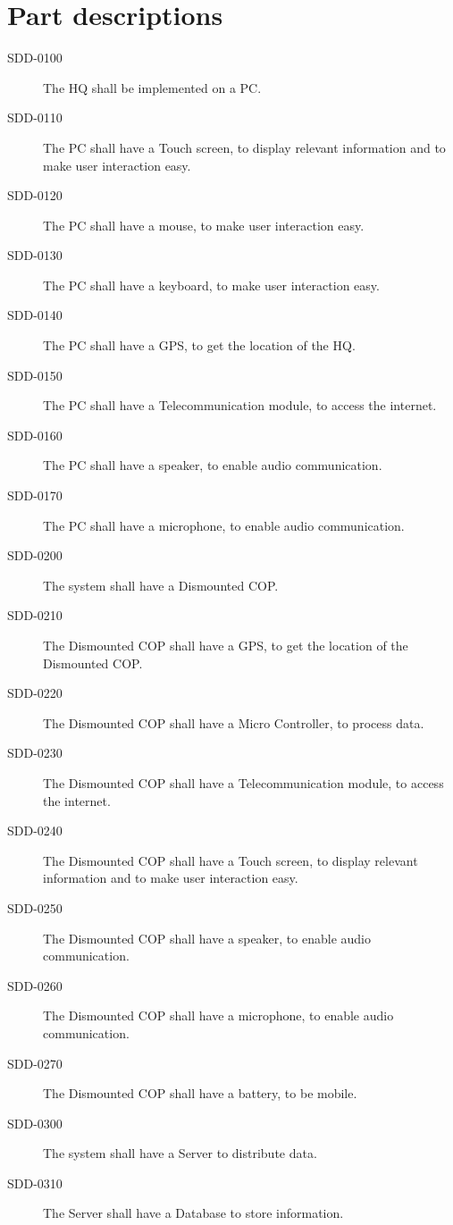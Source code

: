 \section{Part descriptions}
\begin{description}
\item[SDD-0100] The HQ shall be implemented on a PC.
\item[SDD-0110] The PC shall have a Touch screen, to display relevant information and to make user interaction easy.
\item[SDD-0120] The PC shall have a mouse, to make user interaction easy.
\item[SDD-0130] The PC shall have a keyboard, to make user interaction easy.
\item[SDD-0140] The PC shall have a GPS, to get the location of the HQ.
\item[SDD-0150] The PC shall have a Telecommunication module, to access the internet.
\item[SDD-0160] The PC shall have a speaker, to enable audio communication.
\item[SDD-0170] The PC shall have a microphone, to enable audio communication.
\item[SDD-0200] The system shall have a Dismounted COP.
\item[SDD-0210] The Dismounted COP shall have a GPS, to get the location of the Dismounted COP.
\item[SDD-0220] The Dismounted COP shall have a Micro Controller, to process data.
\item[SDD-0230] The Dismounted COP shall have a Telecommunication module, to access the internet.
\item[SDD-0240] The Dismounted COP shall have a Touch screen, to display relevant information and to make user interaction easy.
\item[SDD-0250] The Dismounted COP shall have a speaker, to enable audio communication.
\item[SDD-0260] The Dismounted COP shall have a microphone, to enable audio communication.
\item[SDD-0270] The Dismounted COP shall have a battery, to be mobile.
\item[SDD-0300] The system shall have a Server to distribute data.
\item[SDD-0310] The Server shall have a Database to store information.
\end{description}

